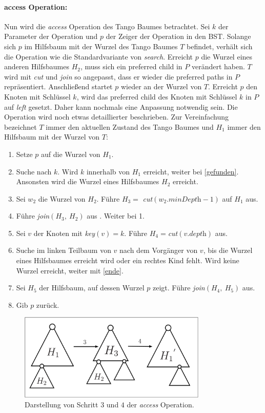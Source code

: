 \documentclass[a4paper,12pt]{article}
\begin{document}
\paragraph{access Operation:}
Nun wird die \textit{access} Operation des Tango Baumes betrachtet. Sei $k$ der Parameter der Operation und $p$ der Zeiger der Operation in den BST. Solange sich $p$ im Hilfsbaum mit der Wurzel des Tango Baumes $T$ befindet, verhält sich die Operation wie die Standardvariante von \textit{search}. Erreicht $p$ die Wurzel eines anderen Hilfsbaumes $H_2$, muss sich ein preferred child in $P$ verändert haben. $T$ wird mit \textit{cut} und \textit{join} so angepasst, dass er wieder die preferred paths in $P$ repräsentiert. Anschließend startet $p$ wieder an der Wurzel von $T$. Erreicht $p$ den Knoten mit Schlüssel $k$, wird das preferred child des Knoten mit Schlüssel $k$ in $P$ auf \textit{left} gesetzt. Daher kann nochmals eine Anpassung notwendig sein. Die Operation wird noch etwas detaillierter beschrieben. Zur Vereinfachung bezeichnet $T$ immer den aktuellen Zustand des Tango Baumes und $H_1$ immer den Hilfsbaum mit der Wurzel von $T$:
\begin{enumerate}
	\item Setze $p$ auf die Wurzel von $H_1$.
	\item Suche nach $k$. Wird $k$ innerhalb von $H_1$ erreicht, weiter bei \ref{gefunden}. Ansonsten wird die Wurzel eines Hilfsbaumes $H_2$ erreicht.
	\item Sei $w_2$ die Wurzel von $H_2$. Führe $H_3 =$ \textit{cut}$\left(w_2.\textit{minDepth} - 1\right)$ auf $H_1$ aus.
	\item Führe \textit{join}$\left(H_3, ~H_2\right)$ aus . Weiter bei 1.
	\item \label{gefunden} Sei $v$ der Knoten mit \textit{key}$\left(v\right) = k$. Führe $H_4=$\textit{cut}$ \left(v.\textit{depth}\right)$ aus. 
	\item Suche im linken Teilbaum von $v$ nach dem Vorgänger von $v$, bis die Wurzel eines Hilfsbaumes erreicht wird oder ein rechtes Kind fehlt. Wird keine Wurzel erreicht, weiter mit \ref{ende}.
	\item Sei $H_5$ der Hilfsbaum, auf dessen Wurzel $p$ zeigt. Führe \textit{join}$\left(H_4, ~H_5\right)$ aus.
	\item \label{ende} Gib $p$ zurück.
\end{enumerate}
\begin{figure}[H]
	\centering
	\includegraphics[width=0.8\textwidth]{Medien/Tango/cutJoin}
	\caption{Darstellung von Schritt $3$ und $4$ der \textit{access} Operation. }
	\label{fig:cutJoin}
\end{figure}
\end{document}

